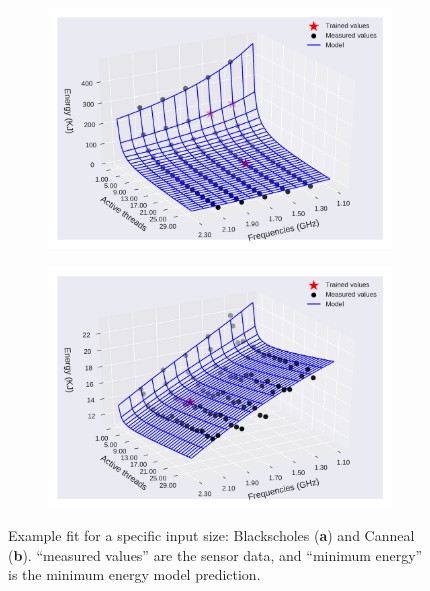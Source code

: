 \begin{figure}[H]
	\centering
	\captionsetup[subfigure]{justification=centering}
	\begin{subfigure}[b]{0.45\textwidth}
		\centerline{\includegraphics[width=\columnwidth]{models/figures/energy/freq_cores/completo_black_5.pdf}}
		\caption{}
		\label{fig:en_eq_black_fc}
	\end{subfigure}
	\begin{subfigure}[b]{0.45\textwidth}
		\centerline{\includegraphics[width=\columnwidth]{models/figures/energy/freq_cores/completo_canneal_1.pdf}}
		\caption{}
		\label{fig:en_eq_canneal_fc}
	\end{subfigure}
	
	\caption{Example fit for a specific input size: Blackscholes (\textbf{a}) and Canneal (\textbf{b}).  “measured values” are the sensor data, and “minimum energy” is the minimum energy model prediction.
	}
	\label{fig:en_eq_freq_cores_fc}
\end{figure}
